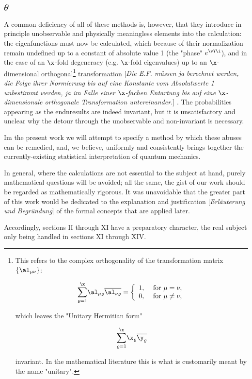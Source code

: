 \documentclass{article}
\newcommand{\WTF}[1]{
[\it{\small{#1}}]
}
\newcommand{\uequ}[1]{
\begin{align*}
#1
\end{align*}
}
\newcommand{\const}[1]{#1}
\newcommand{\barred}[1]{
\overline{#1}
}
\renewcommand{\it}[1]{\textit{#1}}
\newcommand{\sumXY}[2]{\underset{#1}{\overset{#2}{\sum}}}
\renewcommand{\exp}[1]{\const{e}^{#1}}
\begin{document}
\subsection*{$\theta$}
A common deficiency of all of these methods is, however, that they introduce in principle unobservable and physically meaningless elements into the calculation: the eigenfunctions must now be calculated, which because of their normalization remain undefined up to a constant of absolute value 1 (the "phase" $\exp{\vY\i}$), and in the case of an $\x$-fold degeneracy (e.g. $\x$-fold eigenvalues) up to an $\x$-dimensional orthogonal\footnote{
This refers to the complex orthogonality of the transformation matrix $\lbrace \al_{\mu\nu} \rbrace$:
\uequ{
\sumXY{\varrho=1}{\x}\al_{\mu\varrho}\barred{\al_{\nu\varrho}} = \left\{
     \begin{array}{lr}
       1, & \text{ for } \mu = \nu, \\
       0, & \text{ for } \mu \neq \nu,
     \end{array}
   \right.
}
which leaves the "Unitary Hermitian form"
\uequ{
\sumXY{\varrho=1}{\x}\x_\varrho\barred{\y_\varrho}
}
invariant. In the mathematical literature this is what is customarily meant by the name "unitary".
} transformation\WTF{Die E.F. müssen ja berechnet werden, die Folge ihrer Normierung bis auf eine Konstante vom Absolutwerte 1 unbestimmt werden, ja im Falle einer $\x$-fachen Entartung bis auf eine $\x$-dimensionale orthogonale Transformation untereinander.}. The probabilities appearing as the endnresults are indeed invariant, but it is unsatisfactory and unclear why the detour through the unobservable and non-invariant is necessary.

Im the present work we will attempt to specify a method by which these abuses can be remedied, and, we believe, uniformly and consistently brings together the currently-existing statistical interpretation of quantum mechanics.

In general, where the calculations are not essential to the subject at hand, purely mathematical questions will be avoided; all the same, the gist of our work should be regarded as mathematically rigorous. It was unavoidable that the greater part of this work would be dedicated to the explanation and justification\WTF{Erläuterung und Begründung} of the formal concepts that are applied later.

Accordingly, sections II through XI have a preparatory character, the real subject only being handled in sections XI through XIV.
\end{document}
